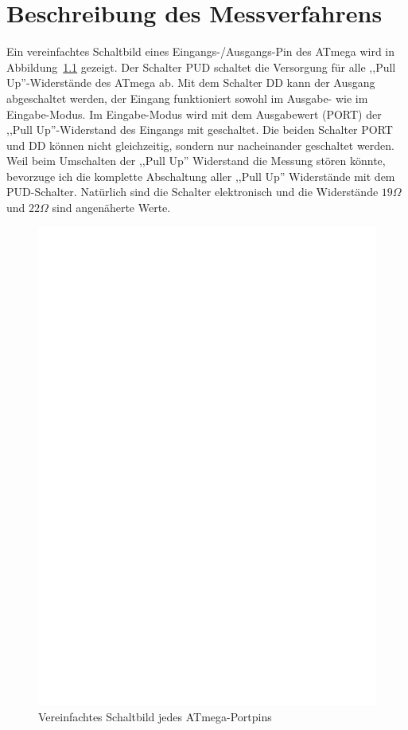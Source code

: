 \chapter{Beschreibung des Messverfahrens}
Ein vereinfachtes Schaltbild eines Eingangs-/Ausgangs-Pin des ATmega wird in Abbildung~\ref{fig:port} gezeigt.
Der Schalter PUD schaltet die Versorgung für alle ,,Pull Up''-Widerstände des ATmega ab.
Mit dem Schalter DD kann der Ausgang abgeschaltet werden, der Eingang funktioniert sowohl im Ausgabe- wie im
Eingabe-Modus. Im Eingabe-Modus wird mit dem Ausgabewert (PORT) der ,,Pull Up''-Widerstand des Eingangs mit geschaltet.
Die beiden Schalter PORT und DD können nicht gleichzeitig, sondern nur nacheinander geschaltet werden.
Weil beim Umschalten der ,,Pull Up'' Widerstand die Messung stören könnte, bevorzuge ich die komplette
Abschaltung aller ,,Pull Up'' Widerstände mit dem PUD-Schalter.
Natürlich sind die Schalter elektronisch und die Widerstände \(19\Omega\) und \(22\Omega\) sind angenäherte Werte.
\begin{figure}[H]
\centering
\includegraphics[]{../FIG/port.eps}
\caption{Vereinfachtes Schaltbild jedes ATmega-Portpins}
\label{fig:port}
\end{figure}

